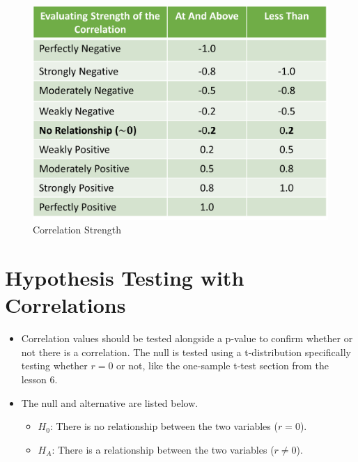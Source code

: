 \documentclass[
  letterpaper,
  DIV=11,
  numbers=noendperiod]{scrreprt}
\providecommand{\tightlist}{%
  \setlength{\itemsep}{0pt}\setlength{\parskip}{0pt}}\usepackage{longtable,booktabs,array}
\begin{document}
\begin{figure}[H]

{\centering \includegraphics{Pictures/Ch8/CorrelationStrength.png}

}

\caption{Correlation Strength}

\end{figure}%


\chapter{Hypothesis Testing with
Correlations}\label{hypothesis-testing-with-correlations}

\begin{itemize}
\tightlist
\item
  Correlation values should be tested alongside a p-value to confirm
  whether or not there is a correlation. The null is tested using a
  t-distribution specifically testing whether \(r = 0\) or not, like the
  one-sample t-test section from the lesson 6.
\item
  The null and alternative are listed below.

  \begin{itemize}
  \tightlist
  \item
    \(H_0\): There is no relationship between the two variables
    (\(r = 0\)).
  \item
    \(H_A\): There is a relationship between the two variables
    (\(r \neq 0\)).
  \end{itemize}
\end{itemize}
\end{document}
